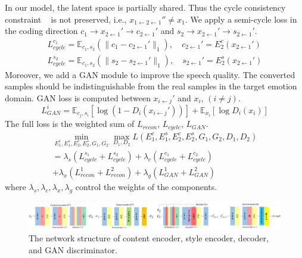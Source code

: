 \documentclass{article}
\begin{document}
In our model, the latent space is partially shared. Thus the cycle consistency constraint ~\cite{Zhu_2017_ICCV} is not preserved, i.e., $x_{1\leftarrow2\leftarrow1}'' \neq x_1$. We apply a semi-cycle loss in the coding direction $c_1 \rightarrow x_{2\leftarrow1}' \rightarrow c_{2\leftarrow1}'$ and $s_2 \rightarrow x_{2\leftarrow1}' \rightarrow s_{2\leftarrow1}'$.
\begin{equation}
\begin{aligned}
L_{cycle}^{c_1} = \mathbb{E}_{c_1, s_2} (\| c_1 - c_{2\leftarrow1}' \|_1), \quad c_{2\leftarrow1}'=E_2^c(x_{2\leftarrow1}') \\
L_{cycle}^{s_2} = \mathbb{E}_{c_1, s_2} (\| s_2 - s_{2\leftarrow1}' \|_1), \quad s_{2\leftarrow1}'=E_2^s(x_{2\leftarrow1}')
\end{aligned}
\end{equation}
Moreover, we add a GAN module to improve the speech quality. The converted samples should be indistinguishable from the real samples in the target emotion domain. GAN loss is computed between $x_{i\leftarrow j}'$ and $x_i$, $(i \neq j)$.
\begin{equation}
L_{GAN}^i = \mathbb{E}_{c_j, s_i}[\log(1-D_i(x_{i\leftarrow j}'))] + \mathbb{E}_{x_i}[\log D_i(x_i)]
\end{equation}
The full loss is the weighted sum of $L_{recon}$, $L_{cycle}$, $L_{GAN}$.
\begin{equation}
\begin{aligned}
\min_{E_1^c,E_1^s,E_2^c,E_2^s, G_1,G_2}\max_{D_1,D_2} L(E_1^c, E_1^s, E_2^c, E_2^s, G_1, G_2, D_1, D_2) \\
= \lambda_s (L_{cycle}^{s_1} + L_{cycle}^{s_2}) + \lambda_c (L_{cycle}^{c_1} + L_{cycle}^{c_2}) \ \qquad \qquad \\
+ \lambda_x (L_{recon}^1 + L_{recon}^2) + \lambda_g (L_{GAN}^1 + L_{GAN}^2) \qquad \quad
\end{aligned}
\end{equation}
where $\lambda_s, \lambda_c, \lambda_x, \lambda_g$ control the weights of the components.

\begin{figure}[t!]
\includegraphics[width=1.0\textwidth]{FIG/NN}
\caption{The network structure of content encoder, style encoder, decoder, and GAN discriminator.}
\label{fig:NN}
\end{figure}
\end{document}
